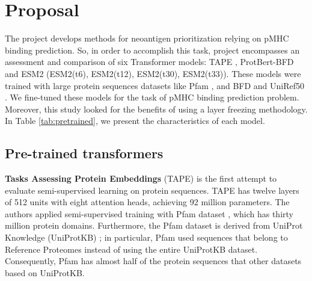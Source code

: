 \section{Proposal}




The project develops methods for neoantigen prioritization relying on pMHC binding prediction. So, in order to accomplish this task, project encompasses an assessment and comparison of six Transformer models: TAPE \cite{rao2019evaluating}, ProtBert-BFD \cite{elnaggar2021prottrans} and ESM2 \cite{lin2023evolutionary} (ESM2(t6), ESM2(t12), ESM2(t30), ESM2(t33)). These models were trained with large protein sequences datasets like Pfam \cite{el2019pfam}, and BFD and UniRef50  \cite{suzek2015uniref}. We fine-tuned these models for the task of pMHC binding prediction problem. Moreover, this study looked for the benefits of using a layer freezing methodology. In Table \ref{tab:pretrained}, we present the characteristics of each model.


\subsection{Pre-trained transformers}

\textbf{Tasks Assessing Protein Embeddings} (TAPE) \cite{rao2019evaluating} is the first attempt to evaluate semi-supervised learning on protein sequences. TAPE has twelve layers of 512 units with eight attention heads, achieving 92 million parameters. The authors applied semi-supervised training with Pfam dataset \cite{el2019pfam}, which has thirty million protein domains. Furthermore, the Pfam dataset is derived from UniProt Knowledge (UniProtKB) \cite{uniprot2018uniprot}; in particular, Pfam used sequences that belong to Reference Proteomes \cite{finn2016pfam} instead of using the entire UniProtKB dataset. Consequently, Pfam has almost half of the protein sequences that other datasets based on UniProtKB. 



